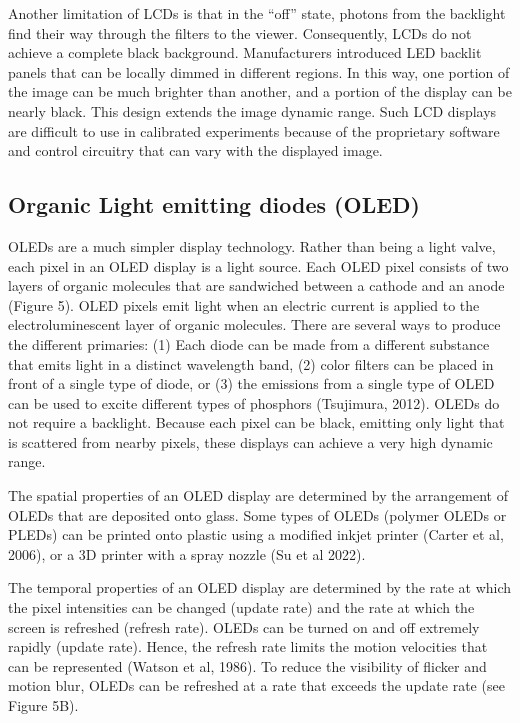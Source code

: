 \documentclass[
  letterpaper,
]{book}
\begin{document}
Another limitation of LCDs is that in the ``off'' state, photons from
the backlight find their way through the filters to the viewer.
Consequently, LCDs do not achieve a complete black background.
Manufacturers introduced LED backlit panels that can be locally dimmed
in different regions. In this way, one portion of the image can be much
brighter than another, and a portion of the display can be nearly black.
This design extends the image dynamic range. Such LCD displays are
difficult to use in calibrated experiments because of the proprietary
software and control circuitry that can vary with the displayed image.

\subsection{Organic Light emitting diodes
(OLED)}\label{organic-light-emitting-diodes-oled}

OLEDs are a much simpler display technology. Rather than being a light
valve, each pixel in an OLED display is a light source. Each OLED pixel
consists of two layers of organic molecules that are sandwiched between
a cathode and an anode (Figure 5). OLED pixels emit light when an
electric current is applied to the electroluminescent layer of organic
molecules. There are several ways to produce the different primaries:
(1) Each diode can be made from a different substance that emits light
in a distinct wavelength band, (2) color filters can be placed in front
of a single type of diode, or (3) the emissions from a single type of
OLED can be used to excite different types of phosphors (Tsujimura,
2012). OLEDs do not require a backlight. Because each pixel can be
black, emitting only light that is scattered from nearby pixels, these
displays can achieve a very high dynamic range.

The spatial properties of an OLED display are determined by the
arrangement of OLEDs that are deposited onto glass. Some types of OLEDs
(polymer OLEDs or PLEDs) can be printed onto plastic using a modified
inkjet printer (Carter et al, 2006), or a 3D printer with a spray nozzle
(Su et al 2022).

The temporal properties of an OLED display are determined by the rate at
which the pixel intensities can be changed (update rate) and the rate at
which the screen is refreshed (refresh rate). OLEDs can be turned on and
off extremely rapidly (update rate). Hence, the refresh rate limits the
motion velocities that can be represented (Watson et al, 1986). To
reduce the visibility of flicker and motion blur, OLEDs can be refreshed
at a rate that exceeds the update rate (see Figure 5B).
\end{document}
